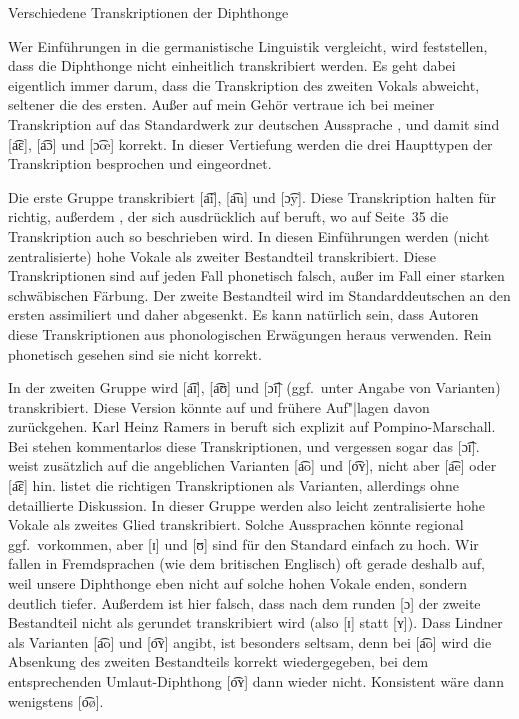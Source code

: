 \begin{Vertiefung}{Verschiedene Transkriptionen der Diphthonge}
\label{vert:diphthonge}

Wer Einführungen in die germanistische Linguistik vergleicht, wird feststellen, dass die Diphthonge nicht einheitlich transkribiert werden.
Es geht dabei eigentlich immer darum, dass die Transkription des zweiten Vokals abweicht, seltener die des ersten.
Außer auf mein Gehör vertraue ich bei meiner Transkription auf das Standardwerk zur deutschen Aussprache \citet{KrechEa2009}, und damit sind [a͡ɛ], [a͡ɔ] und [ɔ͡œ] korrekt.
In dieser Vertiefung werden die drei Haupttypen der Transkription besprochen und eingeordnet.

Die erste Gruppe transkribiert [a͡i], [a͡u] und [ɔ͡y].
Diese Transkription halten \citet[47]{BuschStenschke2014} für richtig, außerdem \citet[63]{Ernst2011}, der sich ausdrücklich auf \citet{Mangold2006} beruft, wo auf Seite~35 die Transkription auch so beschrieben wird.
In diesen Einführungen werden (nicht zentralisierte) hohe Vokale als zweiter Bestandteil transkribiert.
Diese Transkriptionen sind auf jeden Fall phonetisch falsch, außer im Fall einer starken schwäbischen Färbung.
Der zweite Bestandteil wird im Standarddeutschen an den ersten assimiliert und daher abgesenkt.
Es kann natürlich sein, dass Autoren diese Transkriptionen aus phonologischen Erwägungen heraus verwenden.
Rein phonetisch gesehen sind sie nicht korrekt.

In der zweiten Gruppe wird [a͡ɪ], [a͡ʊ] und [ɔ͡ɪ] (ggf.\ unter Angabe von Varianten) transkribiert.
Diese Version könnte auf \citet{Pompinomarschall2009} und frühere Auf"|lagen davon zurückgehen.
Karl Heinz Ramers in \citet[81]{MeibauerEa2015} beruft sich explizit auf Pompino-Marschall.
Bei \citet[28]{FuhrhopPeters2013} stehen kommentarlos diese Transkriptionen, und \citet[184]{KesselReimann2010} vergessen sogar das [ɔ͡ɪ].
\citet{Lindner2014} weist zusätzlich auf die angeblichen Varianten [a͡o] und [o͡ʏ], nicht aber [a͡e] oder [a͡ɛ] hin.
\citet[74]{Pelz1996} listet die richtigen Transkriptionen als Varianten, allerdings ohne detaillierte Diskussion.
In dieser Gruppe werden also leicht zentralisierte hohe Vokale als zweites Glied transkribiert.
Solche Aussprachen könnte regional ggf.\ vorkommen, aber [ɪ] und [ʊ] sind für den Standard einfach zu hoch.
Wir fallen in Fremdsprachen (wie dem britischen Englisch) oft gerade deshalb auf, weil unsere Diphthonge eben nicht auf solche hohen Vokale enden, sondern deutlich tiefer.
Außerdem ist hier falsch, dass nach dem runden [ɔ] der zweite Bestandteil nicht als gerundet transkribiert wird (also [ɪ] statt [ʏ]).
Dass Lindner als Varianten [a͡o] und [o͡ʏ] angibt, ist besonders seltsam, denn bei [a͡o] wird die Absenkung des zweiten Bestandteils korrekt wiedergegeben, bei dem entsprechenden Umlaut-Diphthong [o͡ʏ] dann wieder nicht.
Konsistent wäre dann wenigstens [o͡ø].


\end{Vertiefung}
